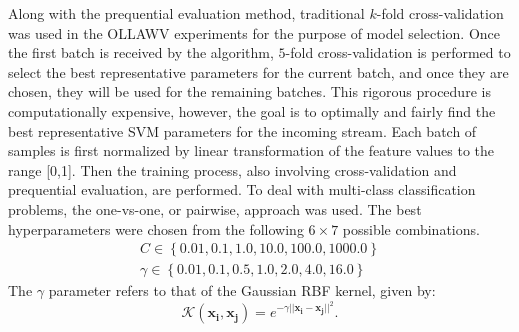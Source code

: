\documentclass[reqno]{vcuthesis}
\newcommand{\set}[1]{{\left\{#1\right\}}}
\newcommand{\norm}[1]{{||#1||}}
\numberwithin{equation}{chapter}
\begin{document}
Along with the prequential evaluation method, traditional $k$-fold cross-validation was used in the OLLAWV experiments for the purpose of model selection. Once the first batch is received by the algorithm, $5$-fold cross-validation is performed to select the best representative parameters for the current batch, and once they are chosen, they will be used for the remaining batches. This rigorous procedure is computationally expensive, however, the goal is to optimally and fairly find the best representative SVM parameters for the incoming stream. Each batch of samples is first normalized by linear transformation of the feature values to the range [0,1]. Then the training process, also involving cross-validation and prequential evaluation, are performed. To deal with multi-class classification problems, the one-vs-one, or pairwise, approach was used. The best hyperparameters were chosen from the following $6 \times 7$ possible combinations. 
\begin{subequations}
\begin{align*}
C \in \set{0.01, 0.1, 1.0, 10.0, 100.0, 1000.0} \\
\gamma \in \set{0.01, 0.1, 0.5, 1.0, 2.0, 4.0, 16.0} 
\end{align*}
\end{subequations}
The $\gamma$ parameter refers to that of the Gaussian RBF kernel, given by:
\begin{equation}
\label{eq:rbfds}
\mathcal{K}(\bm{x_i},\bm{x_j}) = e^{-\gamma\norm{\bm{x_i} - \bm{x_j}}^2}.
\end{equation}
\end{document}

